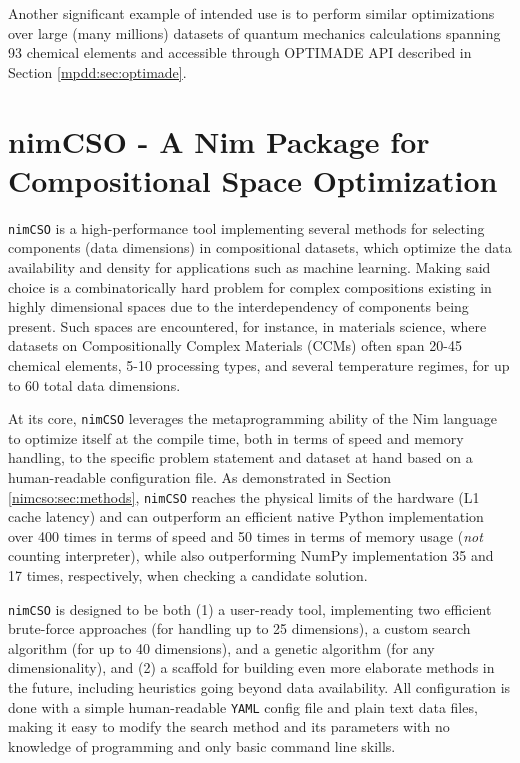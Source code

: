 Another significant example of intended use is to perform similar
optimizations over large (many millions) datasets of quantum mechanics
calculations spanning 93 chemical elements and accessible through
OPTIMADE API \cite{Evans2024} described in Section \ref{mpdd:sec:optimade}.


\section{nimCSO - A Nim Package for Compositional Space Optimization} \label{nimcso:sec:nimcsosoftware}

\texttt{nimCSO} is a high-performance tool implementing several methods
for selecting components (data dimensions) in compositional datasets,
which optimize the data availability and density for applications such
as machine learning. Making said choice is a combinatorically hard
problem for complex compositions existing in highly dimensional spaces
due to the interdependency of components being present. Such spaces are
encountered, for instance, in materials science, where datasets on
Compositionally Complex Materials (CCMs) often span 20-45 chemical
elements, 5-10 processing types, and several temperature regimes, for up
to 60 total data dimensions.

At its core, \texttt{nimCSO} leverages the metaprogramming ability of
the Nim language \cite{Rumpf2006Nim:github.com/nim-lang/Nim} to
optimize itself at the compile time, both in terms of speed and memory
handling, to the specific problem statement and dataset at hand based on
a human-readable configuration file. As demonstrated in Section \ref{nimcso:sec:methods}, \texttt{nimCSO} reaches the physical limits of the hardware (L1
cache latency) and can outperform an efficient native Python
implementation over 400 times in terms of speed and 50 times in terms of
memory usage (\emph{not} counting interpreter), while also outperforming
NumPy implementation 35 and 17 times, respectively, when checking a
candidate solution.

\texttt{nimCSO} is designed to be both (1) a user-ready tool,
implementing two efficient brute-force approaches (for handling up to 25
dimensions), a custom search algorithm (for up to 40 dimensions), and a
genetic algorithm (for any dimensionality), and (2) a scaffold for
building even more elaborate methods in the future, including heuristics
going beyond data availability. All configuration is done with a simple
human-readable \texttt{YAML} config file and plain text data files,
making it easy to modify the search method and its parameters with no
knowledge of programming and only basic command line skills.



